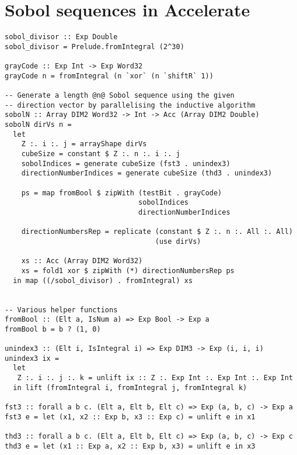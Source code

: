 \chapter{Sobol sequences in Accelerate}
\label{appendix:accelerate-sobol}

\begin{lstlisting}sobol_divisor :: Exp Double
sobol_divisor = Prelude.fromIntegral (2^30)

grayCode :: Exp Int -> Exp Word32
grayCode n = fromIntegral (n `xor` (n `shiftR` 1))

-- Generate a length @n@ Sobol sequence using the given
-- direction vector by parallelising the inductive algorithm
sobolN :: Array DIM2 Word32 -> Int -> Acc (Array DIM2 Double)
sobolN dirVs n =
  let
    Z :. i :. j = arrayShape dirVs
    cubeSize = constant $ Z :. n :. i :. j
    sobolIndices = generate cubeSize (fst3 . unindex3)
    directionNumberIndices = generate cubeSize (thd3 . unindex3)

    ps = map fromBool $ zipWith (testBit . grayCode)
                                sobolIndices
                                directionNumberIndices

    directionNumbersRep = replicate (constant $ Z :. n :. All :. All) 
                                    (use dirVs)

    xs :: Acc (Array DIM2 Word32)
    xs = fold1 xor $ zipWith (*) directionNumbersRep ps
  in map ((/sobol_divisor) . fromIntegral) xs


-- Various helper functions
fromBool :: (Elt a, IsNum a) => Exp Bool -> Exp a
fromBool b = b ? (1, 0)

unindex3 :: (Elt i, IsIntegral i) => Exp DIM3 -> Exp (i, i, i)
unindex3 ix =
  let
   Z :. i :. j :. k = unlift ix :: Z :. Exp Int :. Exp Int :. Exp Int
  in lift (fromIntegral i, fromIntegral j, fromIntegral k)

fst3 :: forall a b c. (Elt a, Elt b, Elt c) => Exp (a, b, c) -> Exp a
fst3 e = let (x1, x2 :: Exp b, x3 :: Exp c) = unlift e in x1

thd3 :: forall a b c. (Elt a, Elt b, Elt c) => Exp (a, b, c) -> Exp c
thd3 e = let (x1 :: Exp a, x2 :: Exp b, x3) = unlift e in x3
\end{lstlisting}


